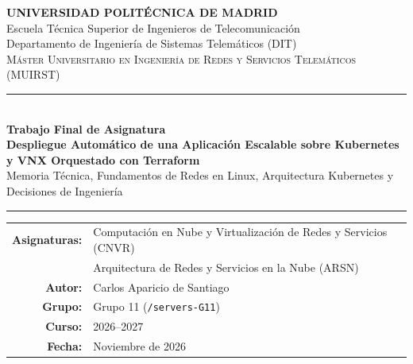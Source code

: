 \documentclass[11pt,a4paper]{report}
\begin{document}
\begin{titlepage}
  \centering
  \vspace*{0.2cm}
  {\Large\bfseries\textcolor{upmblue}{UNIVERSIDAD POLITÉCNICA DE MADRID}}\\[0.2cm]
  {\large Escuela Técnica Superior de Ingenieros de Telecomunicación}\\[0.1cm]
  {\normalsize Departamento de Ingeniería de Sistemas Telemáticos (DIT)}\\[0.25cm]
  {\small\textsc{Máster Universitario en Ingeniería de Redes y Servicios Telemáticos (MUIRST)}}

  \vspace{0.8cm}
  \textcolor{upmaccent}{\rule{\linewidth}{1.5pt}}\\[0.35cm]
  {\large\bfseries\textcolor{darkslate}{Trabajo Final de Asignatura}}\\[0.25cm]
  {\huge\bfseries\textcolor{upmblue}{Despliegue Automático de una Aplicación Escalable sobre Kubernetes y VNX Orquestado con Terraform}}\\[0.3cm]
  {\normalsize Memoria Técnica, Fundamentos de Redes en Linux, Arquitectura Kubernetes y Decisiones de Ingeniería}\\[0.3cm]
  \textcolor{upmaccent}{\rule{\linewidth}{1.5pt}}

  \vspace{0.85cm}
  \begin{tabular}{rl}
    \textbf{Asignaturas:} & Computación en Nube y Virtualización de Redes y Servicios (CNVR) \\
                          & Arquitectura de Redes y Servicios en la Nube (ARSN) \\[0.2cm]
    \textbf{Autor:}       & Carlos Aparicio de Santiago \\[0.15cm]
    \textbf{Grupo:}       & Grupo 11 (\texttt{/servers-G11}) \\[0.15cm]
    \textbf{Curso:}       & 2026--2027 \\[0.15cm]
    \textbf{Fecha:}       & Noviembre de 2026
  \end{tabular}


\end{titlepage}
\end{document}
